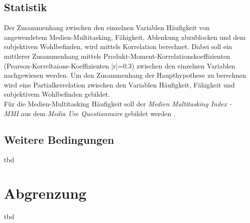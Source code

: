 \subsection*{Statistik}
Der Zusammenhang zwischen den einzelnen Variablen Häufigkeit von angewendetem Medien-Multitasking, Fähigkeit, Ablenkung abzublocken und dem subjektiven Wohlbefinden, wird mittels Korrelation berechnet. Dabei soll ein mittlerer Zusammenhang mittels Produkt-Moment-Korrelationskoeffizienten (Pearson-Korreltaions-Koeffizienten |r|=0.3) zwischen den einzelnen Variablen nachgewiesen werden. Um den Zusammenhang der Haupthypothese zu berechnen wird eine Partialkerrelation zwischen den Variablen Häufigkeit, Fähigkeit und subjektivem Wohlbefinden gebildet.\\
Für die Medien-Multitasking Häufigkeit soll der \textit{Medien Multitasking Index - MMI} aus dem \textit{Media Use Questionnaire} gebildet werden \cite{Ophir2009}.
\subsection*{Weitere Bedingungen}
tbd
\section*{Abgrenzung}\label{section.abgrenzung}
tbd
